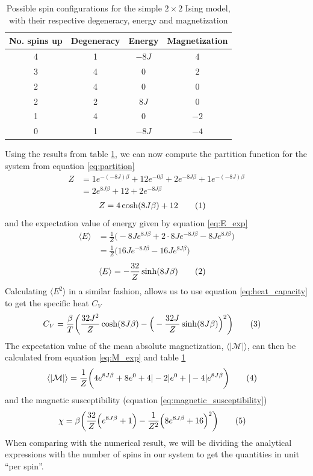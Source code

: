 \documentclass{article}
\newcommand\numberthis{\addtocounter{equation}{1}\tag{\theequation}}
\begin{document}
\begin{table}[H]
  \centering
  \caption{Possible spin configurations for the simple $2\times2$ Ising model, with their respective degeneracy, energy and magnetization}
  \label{tab:spins}
  \begin{tabular}{c|c|c|c}
    No. spins up & Degeneracy & Energy & Magnetization\\\hline
    4 & 1 & $-8J$ & 4\\
    3 & 4 & 0 & 2\\
    2 & 4 & 0 & 0\\
    2 & 2 & $8J$ & 0\\
    1 & 4 & 0 & $-2$\\
    0 & 1 & $-8J$ & $-4$
    \end{tabular}
\end{table}
Using the results from table \ref{tab:spins}, we can now compute the partition function for the system from equation \eqref{eq:partition}
\begin{align*}
  Z &= 1e^{-(-8J)\beta}+ 12e^{-0\beta} + 2e^{-8J\beta} + 1e^{-(-8J)\beta}\\
  &= 2e^{8J\beta} + 12 + 2e^{-8J\beta}
\end{align*}
\begin{align*}
  Z &= 4\cosh(8J\beta) + 12 \numberthis\label{eq:partition2}
\end{align*}
and the expectation value of energy given by equation \eqref{eq:E_exp}
\begin{align*}
  \langle E\rangle &= \frac{1}{Z}\bigg(-8Je^{8J\beta}+2\cdot8Je^{-8J\beta}-8Je^{8J\beta}\bigg)\\
  &= \frac{1}{Z}\bigg(16Je^{-8J\beta}-16Je^{8J\beta}\bigg)
\end{align*}
\begin{align*}
  \langle E\rangle &= -\frac{32}{Z}\sinh(8J\beta) \numberthis\label{eq:E_exp2}
\end{align*}
Calculating $\langle E^2\rangle$ in a similar fashion, allows us to use equation \eqref{eq:heat_capacity} to get the specific heat $C_V$
\begin{align*}
  C_V &= \frac{\beta}{T}\bigg(\frac{32J^2}{Z}\cosh(8J\beta) - \Big(-\frac{32J}{Z}\sinh(8J\beta)\Big)^2\bigg)\numberthis\label{eq:heat_capacity2}
\end{align*}
The expectation value of the mean absolute magnetization, $\langle|\mathcal{M}|\rangle$, can then be calculated from equation \eqref{eq:M_exp} and table \ref{tab:spins}
\begin{align*}
  \langle|\mathcal{M}|\rangle &= \frac{1}{Z}\bigg(4e^{8J\beta}+8e^0+4|-2|e^0 + |-4|e^{8J\beta}\bigg)\numberthis\label{eq:M_exp2}
\end{align*}
and the magnetic susceptibility (equation \eqref{eq:magnetic_susceptibility})
\begin{align*}
\chi &= \beta\bigg(\frac{32}{Z}\Big(e^{8J\beta}+1\Big) -\frac{1}{Z^2}\Big(8e^{8J\beta}+16\Big)^2\bigg)\numberthis\label{eq:magnetic_susceptibility2}
\end{align*}
When comparing with the numerical result, we will be dividing the analytical expressions with the number of spins in our system to get the quantities in unit ``per spin''.
\end{document}
